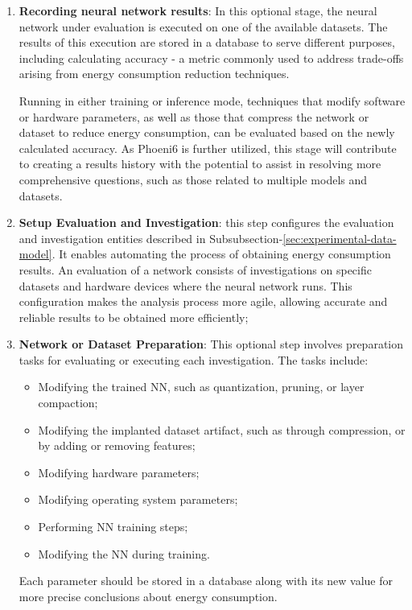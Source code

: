 \begin{enumerate}
    \item \textbf{Recording neural network results}: In this optional stage, the neural network under evaluation is executed on one of the available datasets. The results of this execution are stored in a database to serve different purposes, including calculating accuracy - a metric commonly used to address trade-offs arising from energy consumption reduction techniques.

Running in either training or inference mode, techniques that modify software or hardware parameters, as well as those that compress the network or dataset to reduce energy consumption, can be evaluated based on the newly calculated accuracy. As Phoeni6 is further utilized, this stage will contribute to creating a results history with the potential to assist in resolving more comprehensive questions, such as those related to multiple models and datasets.

    \item \textbf{Setup Evaluation and Investigation}: this step configures the evaluation and investigation entities described in Subsubsection-\ref{sec:experimental-data-model}. It enables automating the process of obtaining energy consumption results. An evaluation of a network consists of investigations on specific datasets and hardware devices where the neural network runs. This configuration makes the analysis process more agile, allowing accurate and reliable results to be obtained more efficiently;
    
    \item \textbf{Network or Dataset Preparation}: 
    This optional step involves preparation tasks for evaluating or executing each investigation. The tasks include:    
        \begin{itemize}
            \item Modifying the trained NN, such as quantization, pruning, or layer compaction;
            \item Modifying the implanted dataset artifact, such as through compression, or by adding or removing features;
            \item Modifying hardware parameters;
            \item Modifying operating system parameters;
            \item Performing NN training steps;
            \item Modifying the NN during training.
        \end{itemize}
        Each parameter should be stored in a database along with its new value for more precise conclusions about energy consumption.
                

\end{enumerate}
